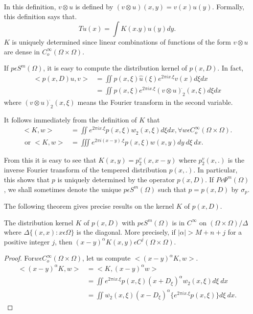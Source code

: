In this definition, $v \otimes u$ is defined by $(v \otimes u)(x,y)=v(x)u(y)$.
Formally, this definition says that.
$$
Tu(x)=\int K(x.y) u (y)dy.
$$\pageoriginale
$K$ is uniquely determined since linear combinations of functions of
the form $v \otimes u$ are dense in $C^\infty_o (\Omega \times
\Omega)$. 

If $ p \epsilon S^m(\Omega)$, it is easy to compute the
distribution kernel of $p(x,D)$. In fact, 
\begin{align*}
  < p(x,D)u,v> &= \iint p(x, \xi)\hat{u}(\xi) e^{2 \pi ix.\xi}v(x)d \xi dx\\
  &= \iint p(x, \xi) e^{2 \pi ix.\xi}(v \otimes u)^{\hat{}}_2 (x,\xi) d \xi dx
\end{align*}
where $(v \otimes u)^{\hat{}}_2 (x,\xi)$ means the Fourier transform
in the second variable. 


It follows immediately from the definition of $K$ that
\begin{align*}
  <  K,w > &= \iint e^{2 \pi ix.\xi}p(x,\xi)w^{\hat{}}_2 (x,\xi) d\xi
  dx, \forall w \epsilon C^\infty_o (\Omega \times \Omega). \\ 
  \text{ or } <K,w> &= \iiint e^{2 \pi i(x-y).\xi} p(x,\xi)w(x,y)dy~d\xi~dx.
\end{align*}

From this it is easy to see that $K(x,y)=p^v_2(x, x-y)$ where
$p^v_2(x,.)$ is the inverse Fourier transform of the tempered
distribution $p(x,.)$. In particular, this shows that $p$ is uniquely
determined by the operator $p(x,D)$. If $P \epsilon
\Psi^m(\Omega)$, we shall sometimes denote the unique $p \epsilon
S^m(\Omega)$ such that $p=p(x,D)$ by $\sigma_p$. 

The following theorem gives precise results on the kernel $K$ of
\break $p(x,D)$.

\setcounter{thm}{9}
\begin{thm} \label{chap4:sec2:thm4.10}
The distribution kernel $K$ of $p(x,D)$ with $p \epsilon
  S^m(\Omega)$ is in $C^\infty$ on $(\Omega \times \Omega) \slash
  \Delta$ where $\Delta \{(x,x): x \epsilon \Omega\}$ is the
  diagonal. More precisely, if $|\alpha |> M+n+j$ for a positive
  integer $j$, then $(x-y)^\alpha K(x,y)\epsilon C^j (\Omega \times
  \Omega)$. 
\end{thm}

\begin{proof}
For\pageoriginale $w \epsilon C^\infty_o(\Omega \times \Omega)$, let us compute
$<(x-y)^\alpha K, w >$. 
\begin{align*}
  < (x-y)^\alpha K,w > &=< K,(x-y)^\alpha w >\\
  &= \iint e^{2 \pi ix.\xi}p(x,\xi)(x+D_\xi)^\alpha w^{\hat{}}_2(x,\xi)d \xi~dx\\
  &= \iint w^{\hat{}}_2(x,\xi)(x-D_\xi)^\alpha \{ e^{2 \pi ix.\xi}p(x,\xi)\}d \xi~dx.
\end{align*}
\end{proof}

